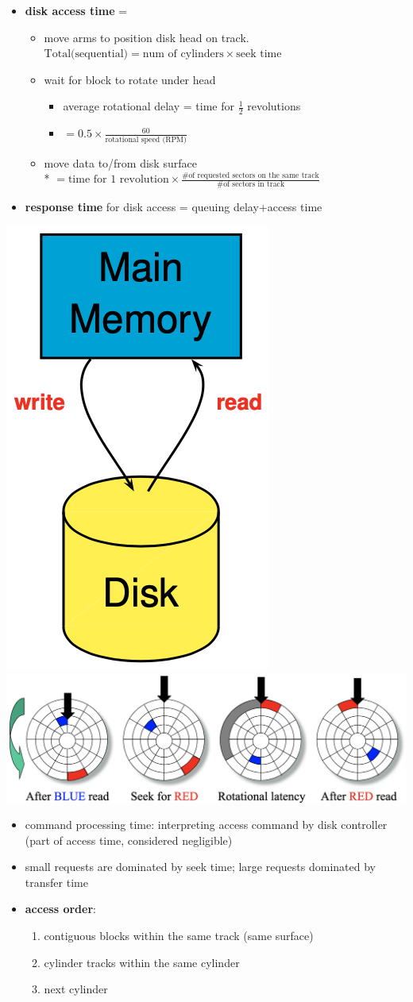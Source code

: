\documentclass[10pt, landscape]{article}
\begin{document}
\begin{multicols*}{4}
  \begin{itemize}
    \item \textbf{disk access time} =
      \begin{itemize}
        \item {} move arms to position disk head on track.
          \\$\text{Total(sequential)} = \text{num of cylinders} \times \text{seek time}$
        \item {} wait for block to rotate under head
          \begin{itemize}
            \item average rotational delay = time for $\frac{1}{2}$ revolutions
            \item $ = 0.5 \times \frac{60}{\text{rotational speed (RPM)}}$
          \end{itemize}
        \item {} move data to/from disk surface
          \\* $= \text{time for 1 revolution} \times \frac{ \text{\# of requested sectors on the same track} }{ \text{\# of sectors in track} } $
      \end{itemize}
    \item \textbf{response time} for disk access = queuing delay+access time
  \end{itemize}

  \includegraphics[width=0.15\linewidth]{cs3223-dbms-storage.png} 
  \includegraphics[width=0.8\linewidth]{cs3223-access-time-example.png} 

  \begin{itemize}
    \item command processing time: interpreting access command by disk controller (part of access time, considered negligible)
    \item small requests are dominated by seek time; large requests dominated by transfer time
    \item \textbf{access order}:
      \begin{enumerate}
        \item contiguous blocks within the same track (same surface)
        \item cylinder tracks within the same cylinder
        \item next cylinder
      \end{enumerate}
  \end{itemize}


\end{multicols*}
\end{document}
